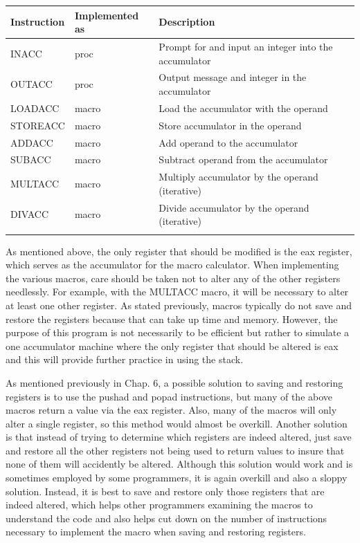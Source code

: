 \documentclass[10pt]{book}
\begin{document}
\begin{center}
\begin{center}
\begin{center}
\begin{tabular}{lll|}
\hline
Instruction & Implemented as & Description \\
\hline
INACC & proc & Prompt for and input an integer into the accumulator \\
OUTACC & proc & Output message and integer in the accumulator \\
LOADACC & macro & Load the accumulator with the operand \\
STOREACC & macro & Store accumulator in the operand \\
ADDACC & macro & Add operand to the accumulator \\
SUBACC & macro & Subtract operand from the accumulator \\
MULTACC & macro & Multiply accumulator by the operand (iterative) \\
DIVACC & macro & Divide accumulator by the operand (iterative) \\
 &  &  \\
\end{tabular}
\end{center}

As mentioned above, the only register that should be modified is the eax register, which serves as the accumulator for the macro calculator. When implementing the various macros, care should be taken not to alter any of the other registers needlessly. For example, with the MULTACC macro, it will be necessary to alter at least one other register. As stated previously, macros typically do not save and restore the registers because that can take up time and memory. However, the purpose of this program is not necessarily to be efficient but rather to simulate a one accumulator machine where the only register that should be altered is eax and this will provide further practice in using the stack.

As mentioned previously in Chap. 6, a possible solution to saving and restoring registers is to use the pushad and popad instructions, but many of the above macros return a value via the eax register. Also, many of the macros will only alter a single register, so this method would almost be overkill. Another solution is that instead of trying to determine which registers are indeed altered, just save and restore all the other registers not being used to return values to insure that none of them will accidently be altered. Although this solution would work and is sometimes employed by some programmers, it is again overkill and also a sloppy solution. Instead, it is best to save and restore only those registers that are indeed altered, which helps other programmers examining the macros to understand the code and also helps cut down on the number of instructions necessary to implement the macro when saving and restoring registers.


\end{center}
\end{center}
\end{document}

